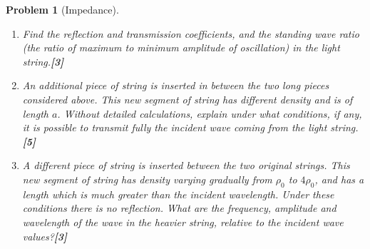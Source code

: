 \documentclass[a4paper]{article}
\theoremstyle{new}
\newtheorem{qns}{Problem}[subsection]
\begin{document}
\begin{qns}[Impedance]
\begin{enumerate}[label=(\roman*)]
\item Find the reflection and transmission coefficients, and the standing wave ratio (the ratio of maximum to minimum amplitude of oscillation) in the light string.\hfill\textbf{[3]}
\item An additional piece of string is inserted in between the two long pieces considered above. This new segment of string has different density and is of length $a$. Without detailed calculations, explain under what conditions, if any, it is possible to transmit fully the incident wave coming from the light string.\hfill\textbf{[5]}
\item A different piece of string is inserted between the two original strings. This new segment of string has density varying gradually from $\rho_0$ to $4\rho_0$, and has a length which is much greater than the incident wavelength. Under these conditions there is no reflection. What are the frequency, amplitude and wavelength of the wave in the heavier string, relative to the incident wave values?\hfill\textbf{[3]}
\end{enumerate}
\end{qns}
\end{document}
